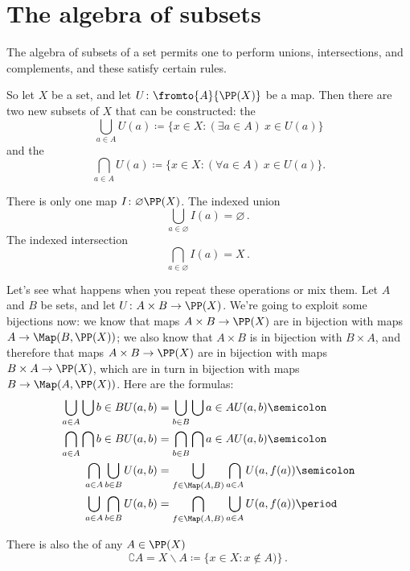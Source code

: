 \section{The algebra of subsets}%
\label{sec:the_algebra_of_subsets}

The algebra of subsets of a set permits one to perform unions, intersections, and complements, and these satisfy certain rules.

So let $X$ be a set, and let $U\colon\fromto{A}{\PP(X)}$ be a map.
Then there are two new subsets of $X$ that can be constructed: the 
\[
	\bigcup_{a\in A}U(a)\coloneq\{x\in X : (\exists a\in A)\ x\in U(a)\}
\]
and the 
\[
	\bigcap_{a\in A}U(a)\coloneq\{x\in X : (\forall a\in A)\ x\in U(a)\}.
\]

\begin{exm}
	There is only one map $I\colon \varnothing \PP(X)$.
	The indexed union
	\[
		\bigcup_{a \in \varnothing} I(a) = \varnothing \period
	\]
	The indexed intersection
	\[
		\bigcap_{a \in \varnothing} I(a) = X \period
	\]
\end{exm}

Let's see what happens when you repeat these operations or mix them.
Let $A$ and $B$ be sets, and let $U \colon A \times B \to \PP(X)$.
We're going to exploit some bijections now:
we know that maps $A \times B \to \PP(X)$ are in bijection with maps $A \to \Map(B, \PP(X))$;
we also know that $A \times B$ is in bijection with $B \times A$, and
therefore that maps $A \times B \to \PP(X)$ are in bijection with maps $B \times A \to \PP(X)$,
which are in turn in bijection with maps $B \to \Map(A, \PP(X))$.
Here are the formulas:
\begin{align*}
	\bigcup_{a\in A} \bigcup{b \in B} U(a,b) &= \bigcup_{b \in B} \bigcup{a \in A} U(a,b) \semicolon \\
	\bigcap_{a\in A} \bigcap{b \in B} U(a,b) &= \bigcap_{b \in B} \bigcap{a \in A} U(a,b) \semicolon \\
	\bigcap_{a\in A}\bigcup_{b\in B} U(a,b) &= \bigcup_{f\in\Map(A,B)} \bigcap_{a\in A} U(a,f(a)) \semicolon \\
	\bigcup_{a\in A} \bigcap_{b\in B} U(a,b) &= \bigcap_{f\in\Map(A,B)} \bigcup_{a\in A} U(a,f(a)) \period
\end{align*}

There is also the  of any $A\in\PP(X)$
\[
	\complement A = X \smallsetminus A \coloneq \{x\in X : x\notin A)\} \period
\]

